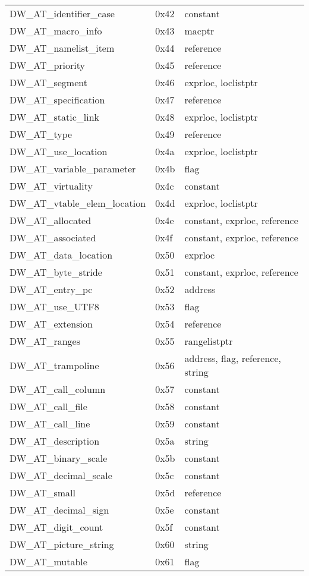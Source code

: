 \begin{centering}
\begin{longtable}{l|l|l}
DW\_AT\_identifier\_case&0x42&constant    \\
DW\_AT\_macro\_info&0x43&macptr    \\
DW\_AT\_namelist\_item&0x44&reference    \\
DW\_AT\_priority&0x45&reference    \\
DW\_AT\_segment&0x46&exprloc, loclistptr    \\
DW\_AT\_specification&0x47&reference    \\
DW\_AT\_static\_link&0x48&exprloc, loclistptr    \\
DW\_AT\_type&0x49&reference    \\
DW\_AT\_use\_location&0x4a&exprloc, loclistptr    \\
DW\_AT\_variable\_parameter&0x4b&flag    \\
DW\_AT\_virtuality&0x4c&constant    \\
DW\_AT\_vtable\_elem\_location&0x4d&exprloc, loclistptr    \\


DW\_AT\_allocated&0x4e&constant, exprloc, reference     \\
DW\_AT\_associated&0x4f&constant, exprloc, reference     \\
DW\_AT\_data\_location&0x50&exprloc     \\
DW\_AT\_byte\_stride&0x51&constant, exprloc, reference     \\
DW\_AT\_entry\_pc&0x52&address     \\
DW\_AT\_use\_UTF8&0x53&flag     \\
DW\_AT\_extension&0x54&reference     \\
DW\_AT\_ranges&0x55&rangelistptr     \\
DW\_AT\_trampoline&0x56&address, flag, reference, string     \\
DW\_AT\_call\_column&0x57&constant     \\
DW\_AT\_call\_file&0x58&constant     \\
DW\_AT\_call\_line&0x59&constant     \\
DW\_AT\_description&0x5a&string     \\
DW\_AT\_binary\_scale&0x5b&constant     \\
DW\_AT\_decimal\_scale&0x5c&constant     \\
DW\_AT\_small &0x5d&reference     \\
DW\_AT\_decimal\_sign&0x5e&constant     \\
DW\_AT\_digit\_count&0x5f&constant     \\
DW\_AT\_picture\_string&0x60&string      \\
DW\_AT\_mutable&0x61&flag     \\



\end{longtable}
\end{centering}
